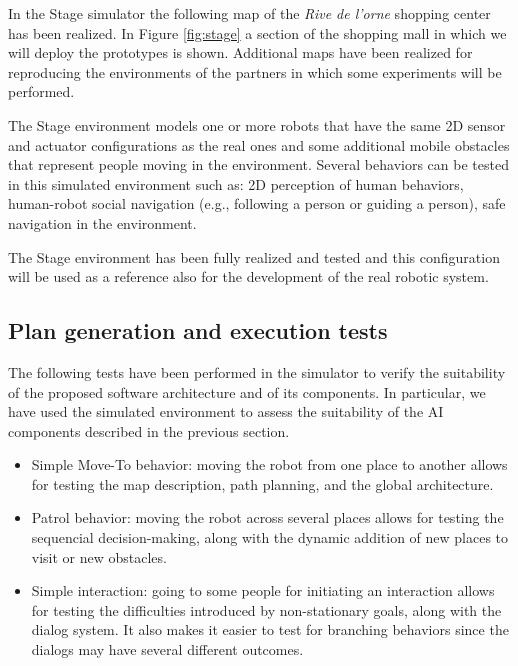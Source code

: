 In the Stage simulator the following map of the \emph{Rive de l'orne} shopping center has been realized. In Figure \ref{fig:stage} a section of the shopping mall in which we will deploy the prototypes is shown.
Additional maps have been realized for reproducing the environments of the partners in which some experiments will be performed.

The Stage environment models one or more robots that have the same 2D sensor and actuator configurations as the real ones and some additional mobile obstacles that represent people moving in the environment. Several behaviors can be tested in this simulated environment such as: 2D perception of human behaviors, human-robot social navigation (e.g., following a person or guiding a person), safe navigation in the environment.

The Stage environment has been fully realized and tested and this configuration will be used as a reference also for the development of the real robotic system.

\subsection{Plan generation and execution tests}

The following tests have been performed in the simulator to verify the suitability of the proposed software architecture and of its components. In particular, we have used the simulated environment to assess the suitability of the AI components described in the previous section.

\begin{itemize}
\item Simple Move-To behavior: moving the robot from one place to another allows for testing the map description, path planning, and the global architecture.
\item Patrol behavior: moving the robot across several places allows for testing the sequencial decision-making, along with the dynamic addition of new places to visit or new obstacles.
\item Simple interaction: going to some people for initiating an interaction allows for testing the difficulties introduced by non-stationary goals, along with the dialog system. It also makes it easier to test for branching behaviors since the dialogs may have several different outcomes.
\end{itemize}

